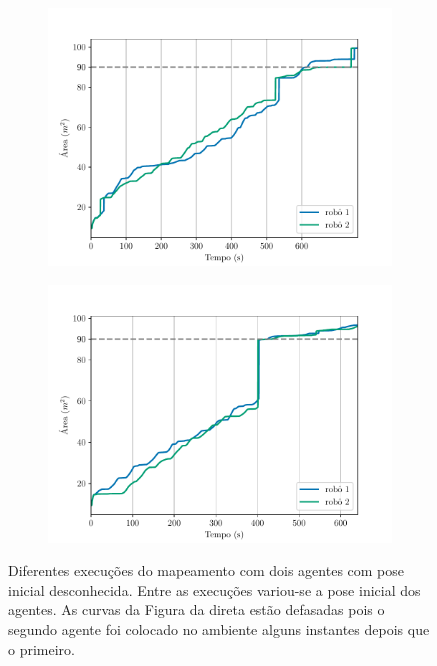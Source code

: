 \begin{figure}
  \centering
  \begin{subfigure}{0.49\textwidth}
    \includegraphics[width=\textwidth]{figs/area_coverage_two_robots-with-unknown-positions-01.pdf}
    \caption{}
    \label{fig:unk-pose-area-coverage-first}
  \end{subfigure}
  \hfill
  \begin{subfigure}{0.49\textwidth}
    \includegraphics[width=\textwidth]{figs/area_coverage_two_robots-with-unknown-positions-02.pdf}
    \caption{}
    \label{fig:}
  \end{subfigure}
  \caption{Diferentes execuções do mapeamento com dois agentes com pose inicial desconhecida. Entre as execuções variou-se a pose inicial dos 
  agentes. As curvas da Figura da direta estão defasadas pois o segundo 
  agente foi colocado no ambiente alguns instantes depois que o primeiro.}
  \label{fig:unknown-initial-pose-area-coverage}
\end{figure}

